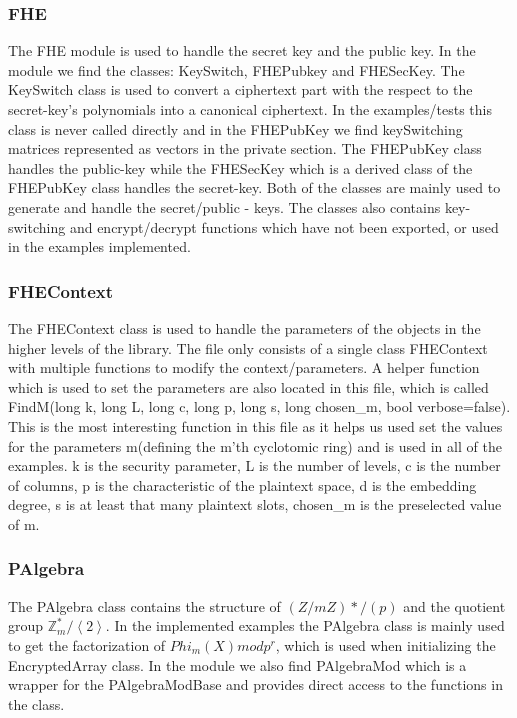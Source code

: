 \subsubsection{FHE}
The FHE module is used to handle the secret key and the public key. In the module we find the classes: KeySwitch, FHEPubkey and FHESecKey. The KeySwitch class is used to convert a ciphertext part with the respect to the secret-key's polynomials into a canonical ciphertext. In the examples/tests this class is never called directly and in the FHEPubKey we find keySwitching matrices represented as vectors in the private section. The FHEPubKey class handles the public-key while the FHESecKey which is a derived class of the FHEPubKey class handles the secret-key. Both of the classes are mainly used to generate and handle the secret/public - keys. The classes also contains key-switching and encrypt/decrypt functions which have not been exported, or used in the examples implemented.

\subsubsection{FHEContext}
The FHEContext class is used to handle the parameters of the objects in the higher levels of the library. The file only consists of a single class FHEContext with multiple functions to modify the context/parameters. A helper function which is used to set the parameters are also located in this file, which is called FindM(long k, long L, long c, long p, long s, long chosen\_m, bool verbose=false). This is the most interesting function in this file as it helps us used set the values for the parameters m(defining the m'th cyclotomic ring) and is used in all of the examples. k is the security parameter, L is the number of levels, c is the number of columns, p is the characteristic of the plaintext space, d is the embedding degree, s is at least that many plaintext slots, chosen\_m is the preselected value of m.

\subsubsection{PAlgebra}
The PAlgebra class contains the structure of $(Z/mZ)* /(p)$ and the quotient group $\mathbb{Z}_{m}^{*}/\left \langle 2 \right \rangle$. In the implemented examples the PAlgebra class is mainly used to get the factorization of $Phi_m(X) mod p^r$, which is used when initializing the EncryptedArray class. In the module we also find PAlgebraMod which is a wrapper for the PAlgebraModBase and provides direct access to the functions in the class.

